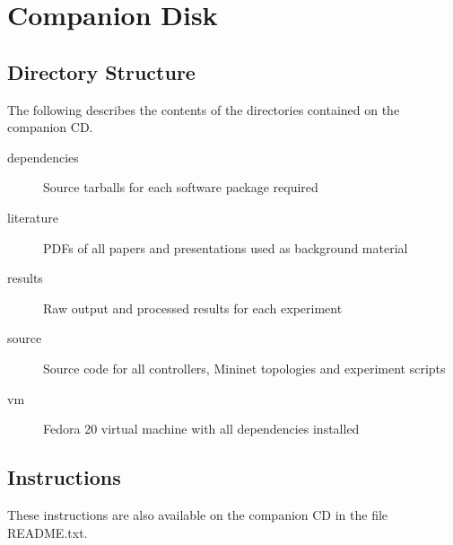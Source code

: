 \chapter{Companion Disk}

\section{Directory Structure}

The following describes the contents of the directories contained on the companion CD.

\begin{description}
\item[dependencies]
Source tarballs for each software package required
\item[literature]
PDFs of all papers and presentations used as background material
\item[results]
Raw output and processed results for each experiment
\item[source]
Source code for all controllers, Mininet topologies and experiment scripts
\item[vm]
Fedora 20 virtual machine with all dependencies installed
\end{description}

\section{Instructions}



These instructions are also available on the companion CD in the file README.txt.

